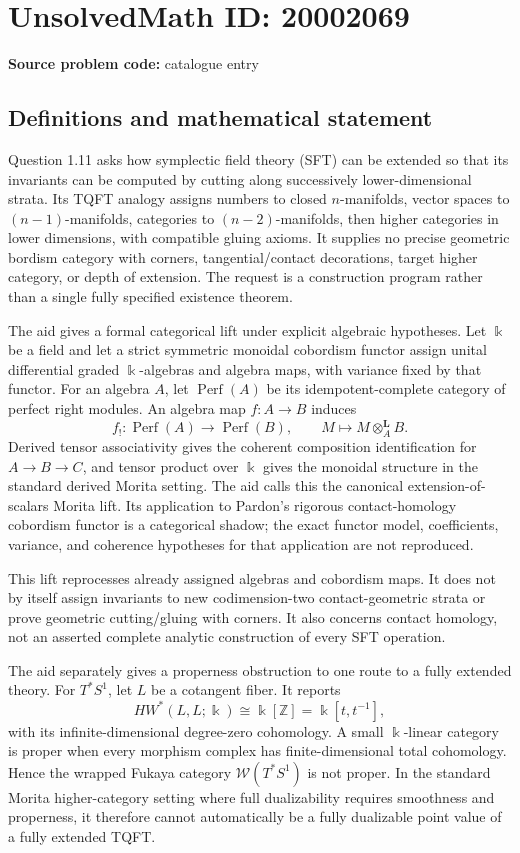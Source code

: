 \documentclass[11pt]{article}
\newcommand{\Z}{\mathbb{Z}}
\begin{document}
\section*{UnsolvedMath ID: 20002069}
\textbf{Source problem code:} catalogue entry
\subsection{Definitions and mathematical statement}
Question 1.11 asks how symplectic field theory (SFT) can be extended so that its invariants can be computed by cutting along successively lower-dimensional strata. Its TQFT analogy assigns numbers to closed \(n\)-manifolds, vector spaces to \((n-1)\)-manifolds, categories to \((n-2)\)-manifolds, then higher categories in lower dimensions, with compatible gluing axioms. It supplies no precise geometric bordism category with corners, tangential/contact decorations, target higher category, or depth of extension. The request is a construction program rather than a single fully specified existence theorem.

The aid gives a formal categorical lift under explicit algebraic hypotheses. Let \(\Bbbk\) be a field and let a strict symmetric monoidal cobordism functor assign unital differential graded \(\Bbbk\)-algebras and algebra maps, with variance fixed by that functor. For an algebra \(A\), let \(\operatorname{Perf}(A)\) be its idempotent-complete category of perfect right modules. An algebra map \(f:A\to B\) induces
\[
 f_!:\operatorname{Perf}(A)\longrightarrow\operatorname{Perf}(B),
 \qquad M\longmapsto M\otimes_A^{\mathbf L}B.
\]
Derived tensor associativity gives the coherent composition identification for \(A\to B\to C\), and tensor product over \(\Bbbk\) gives the monoidal structure in the standard derived Morita setting. The aid calls this the canonical extension-of-scalars Morita lift. Its application to Pardon's rigorous contact-homology cobordism functor is a categorical shadow; the exact functor model, coefficients, variance, and coherence hypotheses for that application are not reproduced.

This lift reprocesses already assigned algebras and cobordism maps. It does not by itself assign invariants to new codimension-two contact-geometric strata or prove geometric cutting/gluing with corners. It also concerns contact homology, not an asserted complete analytic construction of every SFT operation.

The aid separately gives a properness obstruction to one route to a fully extended theory. For \(T^*S^1\), let \(L\) be a cotangent fiber. It reports
\[
 HW^*(L,L;\Bbbk)\cong\Bbbk[\Z]
 =\Bbbk[t,t^{-1}],
\]
with its infinite-dimensional degree-zero cohomology. A small \(\Bbbk\)-linear category is proper when every morphism complex has finite-dimensional total cohomology. Hence the wrapped Fukaya category \(\mathcal W(T^*S^1)\) is not proper. In the standard Morita higher-category setting where full dualizability requires smoothness and properness, it therefore cannot automatically be a fully dualizable point value of a fully extended TQFT.
\end{document}

